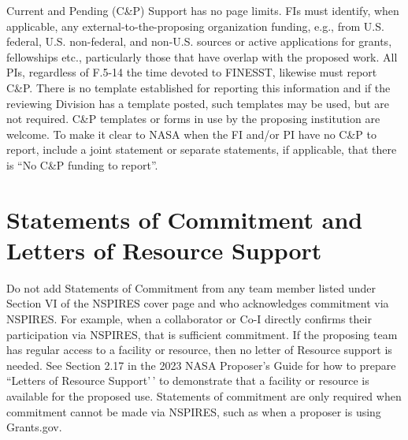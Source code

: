 \documentclass[
  letterpaper,
  DIV=11,
  numbers=noendperiod]{scrartcl}
\begin{document}
\begin{tcolorbox}[enhanced jigsaw, colback=white, opacityback=0, titlerule=0mm, opacitybacktitle=0.6, arc=.35mm, breakable, toprule=.15mm, colbacktitle=quarto-callout-note-color!10!white, bottomtitle=1mm, toptitle=1mm, leftrule=.75mm, coltitle=black, rightrule=.15mm, colframe=quarto-callout-note-color-frame, bottomrule=.15mm, left=2mm, title=\textcolor{quarto-callout-note-color}{\faInfo}\hspace{0.5em}{Note}]

Current and Pending (C\&P) Support has no page limits. FIs must
identify, when applicable, any external-to-the-proposing organization
funding, e.g., from U.S. federal, U.S. non-federal, and non-U.S. sources
or active applications for grants, fellowships etc., particularly those
that have overlap with the proposed work. All PIs, regardless of F.5-14
the time devoted to FINESST, likewise must report C\&P. There is no
template established for reporting this information and if the reviewing
Division has a template posted, such templates may be used, but are not
required. C\&P templates or forms in use by the proposing institution
are welcome. To make it clear to NASA when the FI and/or PI have no C\&P
to report, include a joint statement or separate statements, if
applicable, that there is ``No C\&P funding to report''.

\end{tcolorbox}

\section{Statements of Commitment and Letters of Resource
Support}\label{statements-of-commitment-and-letters-of-resource-support}

\begin{tcolorbox}[enhanced jigsaw, colback=white, opacityback=0, titlerule=0mm, opacitybacktitle=0.6, arc=.35mm, breakable, toprule=.15mm, colbacktitle=quarto-callout-note-color!10!white, bottomtitle=1mm, toptitle=1mm, leftrule=.75mm, coltitle=black, rightrule=.15mm, colframe=quarto-callout-note-color-frame, bottomrule=.15mm, left=2mm, title=\textcolor{quarto-callout-note-color}{\faInfo}\hspace{0.5em}{Note}]

Do not add Statements of Commitment from any team member listed under
Section VI of the NSPIRES cover page and who acknowledges commitment via
NSPIRES. For example, when a collaborator or Co-I directly confirms
their participation via NSPIRES, that is sufficient commitment. If the
proposing team has regular access to a facility or resource, then no
letter of Resource support is needed. See Section 2.17 in the 2023 NASA
Proposer's Guide for how to prepare ``Letters of Resource Support'\,' to
demonstrate that a facility or resource is available for the proposed
use. Statements of commitment are only required when commitment cannot
be made via NSPIRES, such as when a proposer is using Grants.gov.

\end{tcolorbox}
\end{document}

